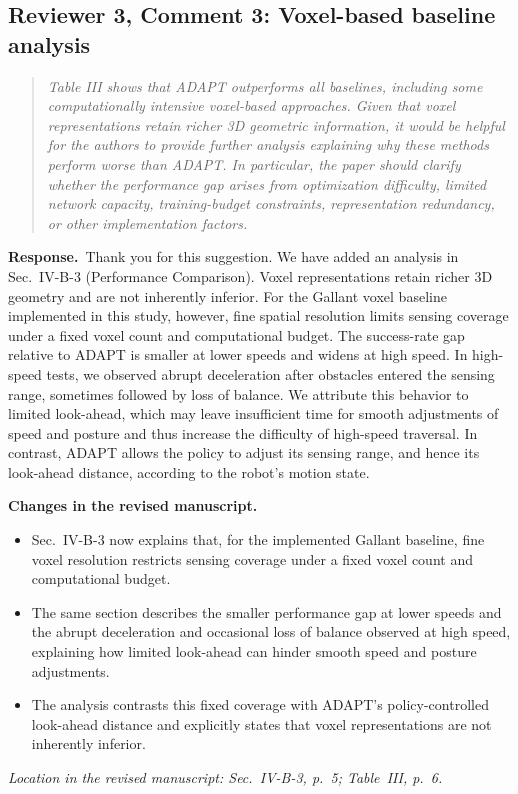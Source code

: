 \documentclass[11pt]{article}
\newenvironment{reviewcomment}{\begin{quote}\color{reviewblue}\itshape}{\end{quote}}
\newcommand{\Response}{\par\noindent\textbf{Response.}\ }
\newcommand{\Changes}{\par\noindent\textbf{Changes in the revised manuscript.}\ }
\newcommand{\Location}[1]{\par\noindent\textit{Location in the revised manuscript: #1}}
\begin{document}
\subsection*{Reviewer 3, Comment 3: Voxel-based baseline analysis}
\begin{reviewcomment}
Table III shows that ADAPT outperforms all baselines, including some computationally intensive voxel-based approaches. Given that voxel representations retain richer 3D geometric information, it would be helpful for the authors to provide further analysis explaining why these methods perform worse than ADAPT. In particular, the paper should clarify whether the performance gap arises from optimization difficulty, limited network capacity, training-budget constraints, representation redundancy, or other implementation factors.
\end{reviewcomment}
\Response Thank you for this suggestion. We have added an analysis in Sec.~IV-B-3 (Performance Comparison). Voxel representations retain richer 3D geometry and are not inherently inferior. For the Gallant voxel baseline implemented in this study, however, fine spatial resolution limits sensing coverage under a fixed voxel count and computational budget. The success-rate gap relative to ADAPT is smaller at lower speeds and widens at high speed. In high-speed tests, we observed abrupt deceleration after obstacles entered the sensing range, sometimes followed by loss of balance. We attribute this behavior to limited look-ahead, which may leave insufficient time for smooth adjustments of speed and posture and thus increase the difficulty of high-speed traversal. In contrast, ADAPT allows the policy to adjust its sensing range, and hence its look-ahead distance, according to the robot's motion state.
\Changes
\begin{itemize}
    \item Sec.~IV-B-3 now explains that, for the implemented Gallant baseline, fine voxel resolution restricts sensing coverage under a fixed voxel count and computational budget.
    \item The same section describes the smaller performance gap at lower speeds and the abrupt deceleration and occasional loss of balance observed at high speed, explaining how limited look-ahead can hinder smooth speed and posture adjustments.
    \item The analysis contrasts this fixed coverage with ADAPT's policy-controlled look-ahead distance and explicitly states that voxel representations are not inherently inferior.
\end{itemize}
\Location{Sec.~IV-B-3, p.~5; Table~III, p.~6.}
\end{document}

